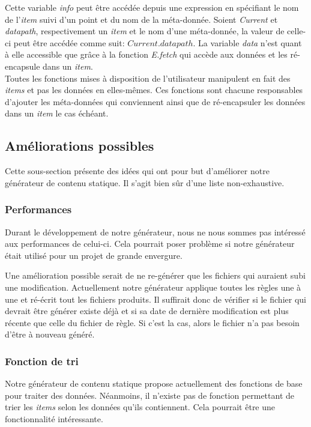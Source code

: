 		Cette variable \textit{info} peut être accédée depuis une expression en spécifiant le nom de l'\textit{item} suivi d'un point et du nom de la méta-donnée. Soient \textit{Current} et \textit{datapath}, respectivement un \textit{item} et le nom d'une méta-donnée, la valeur de celle-ci peut être accédée comme suit: $Current.datapath$. La variable \textit{data} n'est quant à elle accessible que grâce à la fonction \textit{E.fetch} qui accède aux données et les ré-encapsule dans un \textit{item}.\\
		
		Toutes les fonctions mises à disposition de l'utilisateur manipulent en fait des \textit{items} et pas les données en elles-mêmes. Ces fonctions sont chacune responsables d'ajouter les méta-données qui conviennent ainsi que de ré-encapsuler les données dans un \textit{item} le cas échéant.
		
	\subsection{Améliorations possibles}
	
		Cette sous-section présente des idées qui ont pour but d'améliorer notre générateur de contenu statique. Il s'agit bien sûr d'une liste non-exhaustive.
		
		\subsubsection*{Performances}
		
			Durant le développement de notre générateur, nous ne nous sommes pas intéressé aux performances de celui-ci. Cela pourrait poser problème si notre générateur était utilisé pour un projet de grande envergure.
			
			Une amélioration possible serait de ne re-générer que les fichiers qui auraient subi une modification. Actuellement notre générateur applique toutes les règles une à une et ré-écrit tout les fichiers produits. Il suffirait donc de vérifier si le fichier qui devrait être générer existe déjà et si sa date de dernière modification est plus récente que celle du fichier de règle. Si c'est la cas, alors le fichier n'a pas besoin d'être à nouveau généré.
		
		\subsubsection*{Fonction de tri}
		
			Notre générateur de contenu statique propose actuellement des fonctions de base pour traiter des données. Néanmoins, il n'existe pas de fonction permettant de trier les \textit{items} selon les données qu'ils contiennent. Cela pourrait être une fonctionnalité intéressante.  
		
